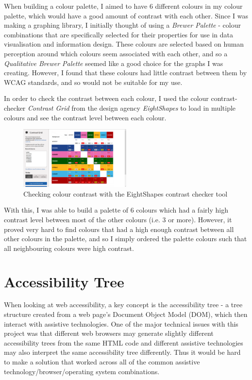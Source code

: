 \documentclass[ %
                    author={Aleena Baig},
                supervisor={Dr Simon Lock},
                    degree={BSc},
                     title={On Making Web Accessible Graphs},
                  subtitle={},
                      year={2019} ]{dissertation}
\begin{document}
When building a colour palette, I aimed to have 6 different colours in my colour palette, which would have a good amount of contrast with each other. Since I was making a graphing library, I initially thought of using a \textit{Brewer Palette} - colour combinations that are specifically selected for their properties for use in data visualisation and information design. These colours are selected based on human perception around which colours seem associated with each other, and so a \textit{Qualitative Brewer Palette} seemed like a good choice for the graphs I was creating. However, I found that these colours had little contrast between them by WCAG standards, and so would not be suitable for my use.

In order to check the contrast between each colour, I used the colour contrast-checker \textit{Contrast Grid} from the design agency \textit{EightShapes} to load in multiple colours and see the contrast level between each colour.

\begin{figure}[h]
\caption{Checking colour contrast with the EightShapes contrast checker tool}
\centering
\includegraphics[width=0.5\textwidth]{images/EightShapeColourChecker.png}
\end{figure}

With this, I was able to build a palette of 6 colours which had a fairly high contrast level between most of the other colours (i.e. 3 or more). However, it proved very hard to find colours that had a high enough contrast between all other colours in the palette, and so I simply ordered the palette colours such that all neighbouring colours were high contrast.

\section{Accessibility Tree}

When looking at web accessibility, a key concept is the accessibility tree - a tree structure created from a web page's Document Object Model (DOM), which then interact with assistive technologies. One of the major technical issues with this project was that different web browsers may generate slightly different accessibility trees from the same HTML code and different assistive technologies may also interpret the same accessibility tree differently. Thus it would be hard to make a solution that worked across all of the common assistive technology/browser/operating system combinations.
\end{document}
